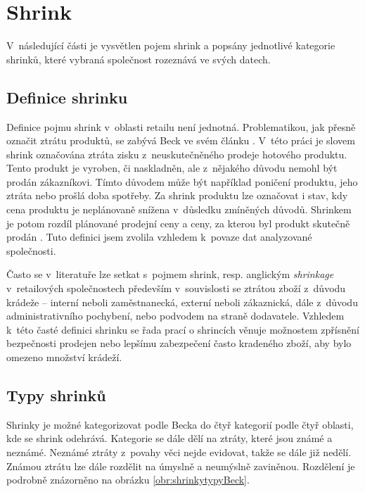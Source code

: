 \section{Shrink}
\label{ch:shrinky}

V~následující části je vysvětlen pojem shrink a popsány jednotlivé kategorie shrinků, které vybraná společnost rozeznává ve svých datech.

\subsection{Definice shrinku}

Definice pojmu shrink v~oblasti retailu není jednotná. Problematikou, jak přesně označit ztrátu produktů, se zabývá Beck ve svém článku \cite{bib:shrink2}. V~této práci je slovem shrink označována ztráta zisku z~neuskutečněného prodeje hotového produktu. Tento produkt je vyroben, či naskladněn, ale z~nějakého důvodu nemohl být prodán zákazníkovi. Tímto důvodem může být například poničení produktu, jeho ztráta nebo prošlá doba spotřeby. Za shrink produktu lze označovat i stav, kdy cena produktu je neplánovaně snížena v~důsledku zmíněných důvodů. Shrinkem je potom rozdíl plánované prodejní ceny a ceny, za kterou byl produkt skutečně prodán \cite{bib:DefShrink}. Tuto definici jsem zvolila vzhledem k~povaze dat analyzované společnosti.

Často se v~literatuře lze setkat s~pojmem shrink, resp. anglickým \emph{shrinkage} v~retailových společnostech především v~souvislosti se ztrátou zboží z~důvodu krádeže -- interní neboli zaměstnanecká, externí neboli zákaznická, dále z~důvodu administrativního pochybení, nebo podvodem na straně dodavatele. Vzhledem k~této časté definici shrinku se řada prací o shrincích věnuje možnostem zpřísnění bezpečnosti prodejen nebo lepšímu zabezpečení často kradeného zboží, aby bylo omezeno množství krádeží.\cite{bib:shrink1,bib:shrink2}



\subsection{Typy shrinků}
\label{sec:shrinkyTypy}

Shrinky je možné kategorizovat podle Becka do čtyř kategorií podle čtyř oblasti, kde se shrink odehrává. Kategorie se dále dělí na ztráty, které jsou známé a neznámé. Neznámé ztráty z~povahy věci nejde evidovat, takže se dále již nedělí. Známou ztrátu lze dále rozdělit na úmyslně a neumýslně zaviněnou. Rozdělení je podrobně znázorněno na obrázku \ref{obr:shrinkytypyBeck}.

